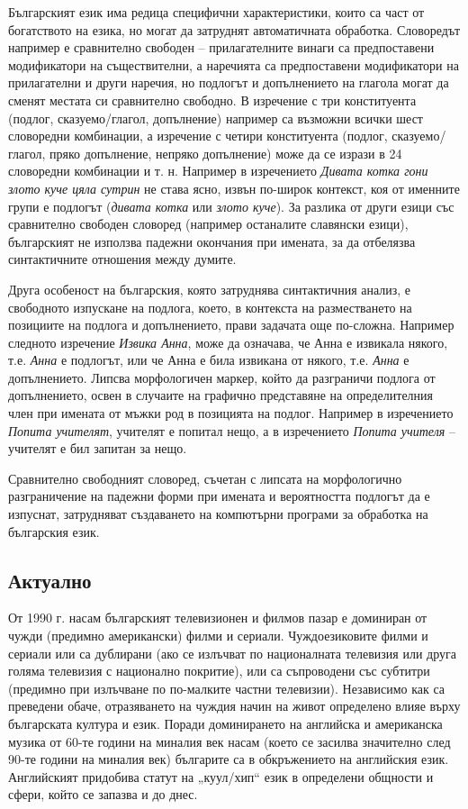\documentclass[]{../../metanetpaper}
\begin{document}
\begin{multicols}{2}
Българският език има редица специфични характеристики, които са част от богатството на езика, но могат
 да затруднят автоматичната обработка. Словоредът например е
 сравнително свободен – прилагателните винаги са
 предпоставени модификатори на съществителни, а
 наречията
 са предпоставени
 модификатори
 на
 прилагателни и други наречия, но подлогът и
 допълнението на глагола могат да сменят местата си
 сравнително свободно. В изречение с три конституента
 (подлог, сказуемо/глагол, допълнение) например са
 възможни всички шест словоредни комбинации, а
 изречение
 с четири
 конституента
 (подлог,
 сказуемо/глагол,
 пряко допълнение,
 непряко
 допълнение) може да се изрази в 24 словоредни
 комбинации и т. н. Например в изречението \textit{Дивата
 котка гони злото куче цяла сутрин} не става ясно, извън
 по-широк контекст, коя от именните групи е подлогът
 (\textit{дивата котка} или  \textit{злото куче}). За разлика от други езици
 със сравнително свободен
 словоред
 (например
 останалите славянски езици), българският не използва
 падежни окончания при имената, за да отбелязва
 синтактичните отношения между думите.

Друга особеност на българския, която затруднява синтактичния анализ, е свободното изпускане на подлога, което, в контекста на разместването на позициите на подлога и допълнението, прави задачата
 още по-сложна. Например следното
 изречение \textit{Извика Анна}, може да означава, че
 Анна е извикала някого, т.е.  \textit{Анна} е подлогът, или че
 Анна е била извикана от някого, т.е.  \textit{Анна} е
 допълнението. Липсва морфологичен маркер, който да
 разграничи подлога от допълнението, освен в случаите
 на графично представяне на определителния член при имената от мъжки род в позицията на подлог. Например
 в изречението \textit{Попита учителят}, учителят е попитал
 нещо, а в изречението \textit{Попита учителя} – учителят е бил
 запитан за нещо.
 
Сравнително свободният словоред, съчетан с липсата на
 морфологично разграничение на падежни форми при
 имената и вероятността подлогът да е изпуснат, затрудняват създаването на компютърни програми за обработка на българския език.

\subsection{Актуално}

От 1990 г. насам българският телевизионен и филмов пазар е доминиран от чужди (предимно американски) филми и сериали. Чуждоезиковите филми и сериали или са дублирани (ако
 се излъчват по националната телевизия или друга
 голяма телевизия с национално покритие), или са
 съпроводени със субтитри (предимно при излъчване по
 по-малките частни телевизии). Независимо как са
 преведени обаче, отразяването на чуждия начин на живот
 определено влияе върху българската култура и
 език. Поради
 доминирането
 на
 английска и американска музика от 60-те години на миналия век насам (което се засилва значително след
 90-те години на миналия век) българите
са в обкръжението на английския език.
 Английският придобива статут на „куул/хип“
 език в определени общности и сфери, който се запазва и до днес. 


\end{multicols}
\end{document}
